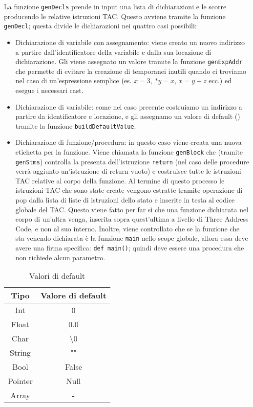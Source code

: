 La funzione {\tt genDecls} prende in input una lista di dichiarazioni e le scorre producendo le relative istruzioni TAC. Questo avviene tramite la funzione {\tt genDecl}; questa divide le dichiarazioni nei quattro casi possibili:
\begin{itemize}
    \item Dichiarazione di variabile con assegnamento: viene creato un nuovo indirizzo a partire dall'identificatore della variabile e dalla sua locazione di dichiarazione. Gli viene assegnato un valore tramite la funzione {\tt genExpAddr} che permette di evitare la creazione di temporanei inutili quando ci troviamo nel caso di un'espressione semplice (es. $x = 3$, $*y= x$, $x = y + z$ ecc.) ed esegue i necessari cast.
    \item Dichiarazione di variabile: come nel caso precente costruiamo un indirizzo a partire da identificatore e locazione, e gli assegnamo un valore di default (\label{table:valori_default}) tramite la funzione {\tt buildDefaultValue}.
    \item Dichiarazione di funzione/procedura: in questo caso viene creata una nuova etichetta per la funzione. Viene chiamata la funzione {\tt genBlock} che (tramite {\tt genStms}) controlla la presenta dell'istruzione {\tt return} (nel caso delle procedure verrà aggiunto un'istruzione di return vuoto) e costruisce tutte le istruzioni TAC relative al corpo della funzione. Al termine di questo processo le istruzioni TAC che sono state create vengono estratte tramite operazione di pop dalla lista di liste di istruzioni dello stato e inserite in testa al codice globale del TAC. Questo viene fatto per far sì che una funzione dichiarata nel corpo di un'altra venga, inserita sopra quest'ultima a livello di Three Address Code, e non al suo interno. Inoltre, viene controllato che se la funzione che sta venendo dichiarata è la funzione {\tt main} nello scope globale, allora essa deve avere una firma specifica: {\tt def main()}; quindi deve essere una procedura che non richiede alcun parametro.
\end{itemize}

\begin{table}
\centering
    \begin{tabular}{|c c|} 
        \hline
        Tipo & Valore di default \\ [0.5ex] 
        \hline\hline
        Int & 0 \\ 
        Float & 0.0  \\
        Char & \textbackslash0 \\
        String &  "" \\
        Bool & False \\ 
        Pointer & Null\\
        Array & - \\[1ex] 
        \hline
    \end{tabular}
    \caption{Valori di default}
    \label{table:valori_default}
\end{table}


